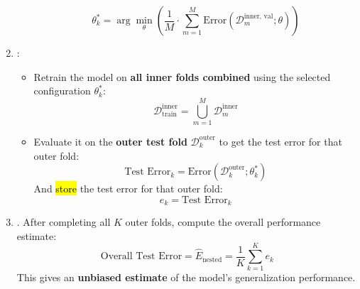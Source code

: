\begin{enumerate}
\begin{itemize}
        \begin{equation*}
            \theta^{*}_{k} = \arg\min_{\theta} \left(
                \dfrac{1}{M} \cdot \sum_{m=1}^{M} \text{Error}\left( \mathcal{D}_m^{\text{inner, val}}; \theta \right)
            \right)
        \end{equation*}
    \end{itemize}
    \item {}:
    \begin{itemize}
        \item Retrain the model on \textbf{all inner folds combined} using the selected configuration $\theta^{*}_{k}$:
        \begin{equation*}
            \mathcal{D}_{\text{train}}^{\text{inner}} = \bigcup_{m=1}^{M} \mathcal{D}_m^{\text{inner}}
        \end{equation*}
        \item Evaluate it on the \textbf{outer test fold} $\mathcal{D}_k^{\text{outer}}$ to get the test error for that outer fold:
        \begin{equation*}
            \text{Test Error}_k = \text{Error}\left( \mathcal{D}_k^{\text{outer}}; \theta^{*}_{k} \right)
        \end{equation*}
        And \hl{store} the test error for that outer fold:
        \begin{equation*}
            e_k = \text{Test Error}_k
        \end{equation*}
    \end{itemize}
    \item {}. After completing all $K$ outer folds, compute the overall performance estimate:
    \begin{equation*}
        \text{Overall Test Error} = \hat{E}_{\text{nested}} = \frac{1}{K} \sum_{k=1}^{K} e_k
    \end{equation*}
    This gives an \textbf{unbiased estimate} of the model's generalization performance.
\end{enumerate}

